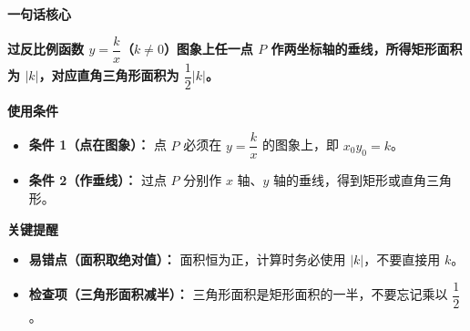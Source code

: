 \begin{summarybox}
	\textbf{\textcolor{CSummary}{一句话核心}}

	\textbf{过反比例函数 $y=\dfrac{k}{x}$（$k\neq 0$）图象上任一点 $P$ 作两坐标轴的垂线，所得矩形面积为 $|k|$，对应直角三角形面积为 $\dfrac{1}{2}|k|$。}

	\medskip
	\textbf{\textcolor{CSummary}{使用条件}}
	\begin{itemize}[leftmargin=*, itemsep=0.5em, topsep=0.4em]
		\item \textbf{条件 1（点在图象）：} 点 $P$ 必须在 $y=\dfrac{k}{x}$ 的图象上，即 $x_0y_0=k$。
		\item \textbf{条件 2（作垂线）：} 过点 $P$ 分别作 $x$ 轴、$y$ 轴的垂线，得到矩形或直角三角形。
	\end{itemize}

	\medskip
	\textbf{\textcolor{CSummary}{关键提醒}}
	\begin{itemize}[leftmargin=*, itemsep=0.5em, topsep=0.4em]
		\item \textbf{易错点（面积取绝对值）：} 面积恒为正，计算时务必使用 $|k|$，不要直接用 $k$。
		\item \textbf{检查项（三角形面积减半）：} 三角形面积是矩形面积的一半，不要忘记乘以 $\dfrac{1}{2}$。
	\end{itemize}
\end{summarybox}